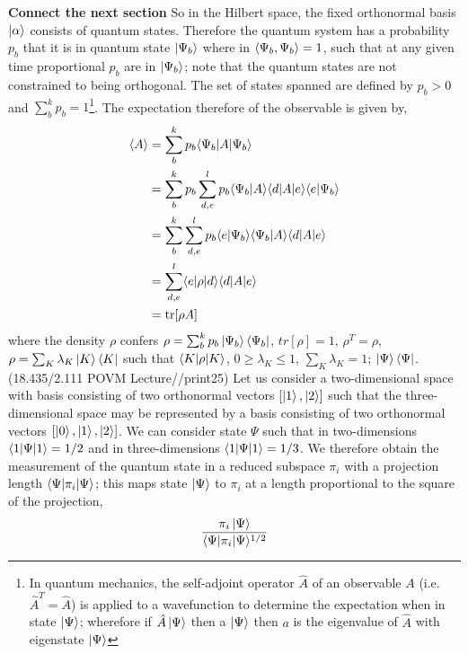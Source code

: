 \documentclass[7pt]{article}
\begin{document}
\textbf{Connect the next section}
So in the Hilbert space, the fixed orthonormal basis $\ket{\alpha}$ consists of quantum states. Therefore the quantum system has a probability $p_b$ that it is in quantum state $\ket{\Psi_b}$ where in  $\inn{\Psi_b,\Psi_b} = 1$, such that at any given time proportional $p_b$  are in $\ket{\Psi_b}$; note that the quantum states are not constrained to being orthogonal. The set of states  spanned are defined by $p_b>0$ and $\sum_b^k p_b = 1$\footnote{In quantum mechanics, the self-adjoint operator $\hat{A}$ of an observable $A$ (i.e. $\hat{A}^T =\hat{A}$) is applied to a wavefunction to determine the expectation when in state $\ket{\Psi}$; wherefore if $\hat{A}\ket{\Psi}$ then a $\ket{\Psi}$ then $a$ is the  eigenvalue of $\hat{A}$ with eigenstate $\ket{\Psi}$}. The expectation therefore of the observable is given by,
\begin{equation}
\begin{split}
\inn{A} & = \sum_b^k p_b \inn{\Psi_b | A | \Psi_b}\\
& = \sum_b^k p_b \sum_{d,e}^l p_b \inn{\Psi_b | A} \inn{d| A | e} \inn{e | \Psi_b}\\
& = \sum_b^k \sum_{d,e}^l p_b \inn{e | \Psi_b} \inn{\Psi_b | A} \inn{d| A | e} \\
& = \sum_{d,e}^l \inn{e|\rho|d} \inn{d| A | e} \\
& = \text{tr} [\rho A ]
\end{split}
\end{equation}
where the density $\rho$ confers $\rho = \sum_b^k p_b\ket{\Psi_b}\bra{\Psi_b}$, $tr[\rho] = 1$, $\rho^T = \rho$, $\rho =  \sum_K \lambda_K\ket{K}\bra{K}$ such that $\inn{K|\rho|K}$, $0 \geq \lambda_K \leq 1$, $\sum_K \lambda_K = 1$; $\ket{\Psi}\bra{\Psi}$. (18.435/2.111 POVM Lecture//print25) Let us consider a two-dimensional space with basis consisting of two orthonormal vectors $[\ket{1},\ket{2}]$ such that the three-dimensional space may be represented by a basis consisting of two orthonormal vectors $[\ket{0},\ket{1},\ket{2}]$. We can consider state $\Psi$ such that in two-dimensions $\inn{1|\Psi|1} = 1/2$ and in three-dimensions $\inn{1|\Psi|1} = 1/3$. We therefore obtain the measurement of the quantum state in a reduced subspace $\pi_i$ with a projection length $\inn{\Psi |\pi_i| \Psi}$; this maps state $\ket{ \Psi }$ to $\pi_i$ at a length proportional to the square of the projection,
\begin{equation}
\dfrac{{\pi_i \ket{\Psi}}}{{\inn{\Psi |\pi_i| \Psi }^{1/2}}}
\end{equation}
\end{document}
